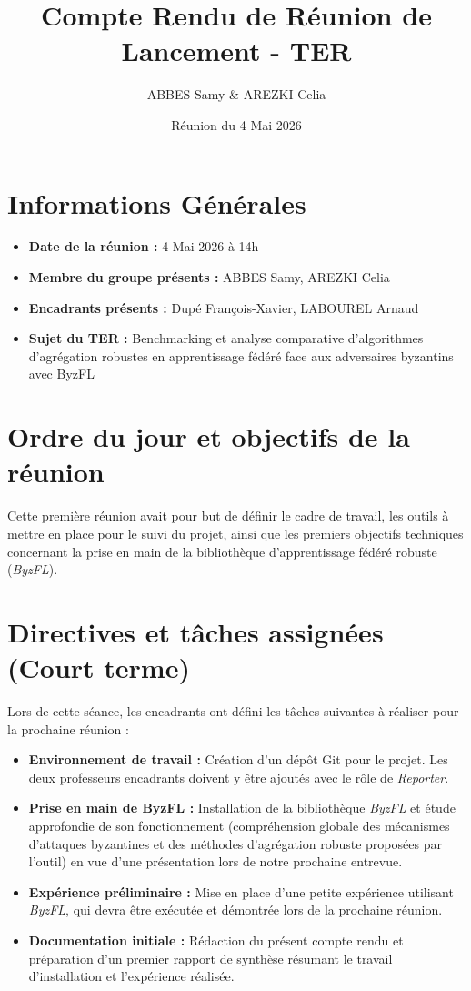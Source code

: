 \documentclass[11pt, a4paper]{article}
\title{\textbf{Compte Rendu de Réunion de Lancement - TER}}
\author{ABBES Samy \& AREZKI Celia}
\date{Réunion du 4 Mai 2026}
\begin{document}
\maketitle

\section*{Informations Générales}
\begin{itemize}
    \item \textbf{Date de la réunion :} 4 Mai 2026 à 14h
    \item \textbf{Membre du groupe présents :} ABBES Samy, AREZKI Celia
    \item \textbf{Encadrants présents :} Dupé François-Xavier, LABOUREL Arnaud
    \item \textbf{Sujet du TER :} Benchmarking et analyse comparative d'algorithmes d'agrégation robustes en apprentissage fédéré face aux adversaires byzantins avec ByzFL
\end{itemize}

\vspace{0.5cm}

\section{Ordre du jour et objectifs de la réunion}
Cette première réunion avait pour but de définir le cadre de travail, les outils à mettre en place pour le suivi du projet, ainsi que les premiers objectifs techniques concernant la prise en main de la bibliothèque d'apprentissage fédéré robuste (\textit{ByzFL}).

\section{Directives et tâches assignées (Court terme)}
Lors de cette séance, les encadrants ont défini les tâches suivantes à réaliser pour la prochaine réunion :
\begin{itemize}
    \item \textbf{Environnement de travail :} Création d'un dépôt Git pour le projet. Les deux professeurs encadrants doivent y être ajoutés avec le rôle de \textit{Reporter}.
    \item \textbf{Prise en main de ByzFL :} Installation de la bibliothèque \textit{ByzFL} et étude approfondie de son fonctionnement (compréhension globale des mécanismes d'attaques byzantines et des méthodes d'agrégation robuste proposées par l'outil) en vue d'une présentation lors de notre prochaine entrevue.
    \item \textbf{Expérience préliminaire :} Mise en place d'une petite expérience utilisant \textit{ByzFL}, qui devra être exécutée et démontrée lors de la prochaine réunion.
    \item \textbf{Documentation initiale :} Rédaction du présent compte rendu et préparation d'un premier rapport de synthèse résumant le travail d'installation et l'expérience réalisée.
\end{itemize}
\end{document}
